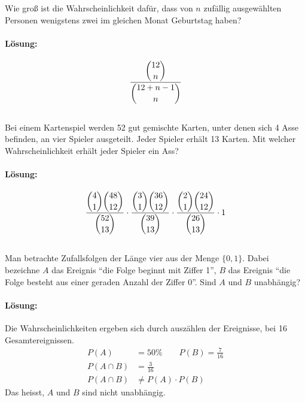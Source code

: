 \documentclass[ngerman]{scrartcl}
\begin{document}
Wie groß ist die Wahrscheinlichkeit dafür, dass von $n$ zufällig ausgewählten Personen wenigstens zwei im gleichen Monat Geburtstag haben?
\paragraph{Lösung:}
\[  \frac{\dbinom{12}{n}}{\dbinom{12+n-1}{n}}   \]


\subsection{}

Bei einem Kartenspiel werden 52 gut gemischte Karten, unter denen sich 4 Asse befinden, an vier Spieler ausgeteilt. Jeder Spieler erhält 13 Karten. Mit welcher Wahrscheinlichkeit erhält jeder Spieler ein Ass?

\paragraph{Lösung:}
\begin{equation*}
\frac{\dbinom{4}{1}\dbinom{48}{12}}{\dbinom{52}{13}} \cdot 
\frac{\dbinom{3}{1}\dbinom{36}{12}}{\dbinom{39}{13}} \cdot
\frac{\dbinom{2}{1}\dbinom{24}{12}}{\dbinom{26}{13}} \cdot 1
\end{equation*}
\subsection{}

Man betrachte Zufallsfolgen der Länge vier aus der Menge $\lbrace 0, 1 \rbrace$. Dabei bezeichne $A$ das Ereignis "`die Folge beginnt mit Ziffer 1"', $B$ das Ereignis "`die Folge besteht aus einer geraden Anzahl der Ziffer 0"'. Sind $A$ und $B$ unabhängig?

\paragraph{Lösung:}
Die Wahrscheinlichkeiten ergeben sich durch auszählen der Ereignisse, bei 16 Gesamtereignissen.
\begin{align*}
P(A) &= 50 \% \qquad P(B) = \frac{7}{16}\\
P(A\cap B) &= \frac{3}{16}\\
P(A\cap B) &\neq P(A) \cdot P(B)
\end{align*}
Das heisst, $A$ und $B$ sind nicht unabhängig.

\subsection{}
\end{document}

